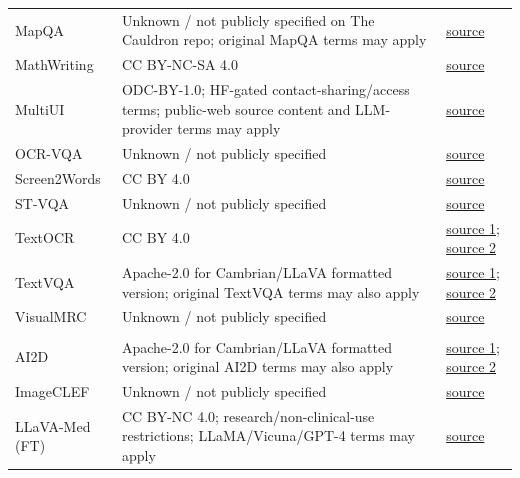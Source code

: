\begin{longtable}{@{}>{\raggedright\arraybackslash}p{}>{\raggedright\arraybackslash}p{}>{\raggedright\arraybackslash}p{}@{}}
MapQA & Unknown / not publicly specified on The Cauldron repo; original MapQA terms may apply & \href{https://huggingface.co/datasets/HuggingFaceM4/the_cauldron/tree/main/mapqa}{source} \\
MathWriting & CC BY-NC-SA 4.0 & \href{https://storage.googleapis.com/mathwriting_data/mathwriting-2024.tgz}{source} \\
MultiUI & ODC-BY-1.0; HF-gated contact-sharing/access terms; public-web source content and LLM-provider terms may apply & \href{https://huggingface.co/datasets/neulab/MultiUI}{source} \\
OCR-VQA & Unknown / not publicly specified & \href{https://huggingface.co/datasets/howard-hou/OCR-VQA}{source} \\
Screen2Words & CC BY 4.0 & \href{https://huggingface.co/datasets/rootsautomation/RICO-Screen2Words}{source} \\
ST-VQA & Unknown / not publicly specified & \href{https://huggingface.co/datasets/vikhyatk/st-vqa}{source} \\
TextOCR & CC BY 4.0 & \href{https://dl.fbaipublicfiles.com/textvqa/images/train_val_images.zip}{source 1}; \href{https://dl.fbaipublicfiles.com/textvqa/data/textocr/TextOCR_0.1_train.json}{source 2} \\
TextVQA & Apache-2.0 for Cambrian/LLaVA formatted version; original TextVQA terms may also apply & \href{https://huggingface.co/datasets/nyu-visionx/Cambrian-10M/resolve/main/textvqa.tar.gz}{source 1}; \href{https://huggingface.co/datasets/nyu-visionx/Cambrian-10M/resolve/main/jsons/Cambrian10M.jsonl}{source 2} \\
VisualMRC & Unknown / not publicly specified & \href{https://drive.google.com/file/d/1kxCIG6Nns7L79i5s7xmvKS92foIDRm4T/view}{source} \\
\midrule
\rowcolor{instructcolor}\multicolumn{3}{l}{\textit{Science}} \\
AI2D & Apache-2.0 for Cambrian/LLaVA formatted version; original AI2D terms may also apply & \href{https://huggingface.co/datasets/nyu-visionx/Cambrian-10M/resolve/main/ai2d.tar.gz}{source 1}; \href{https://huggingface.co/datasets/nyu-visionx/Cambrian-10M/resolve/main/jsons/Cambrian10M.jsonl}{source 2} \\
ImageCLEF & Unknown / not publicly specified & \href{https://drive.google.com/file/d/1ZJcd15D699x0WO3ZPS_3CessN2ed17qR/view?usp=drive_link}{source} \\
LLaVA-Med (FT) & CC BY-NC 4.0; research/non-clinical-use restrictions; LLaMA/Vicuna/GPT-4 terms may apply & \href{https://huggingface.co/datasets/Shubhangi29/llava_med_instruct_60k_inline_mention_filtered}{source} \\

\end{longtable}
